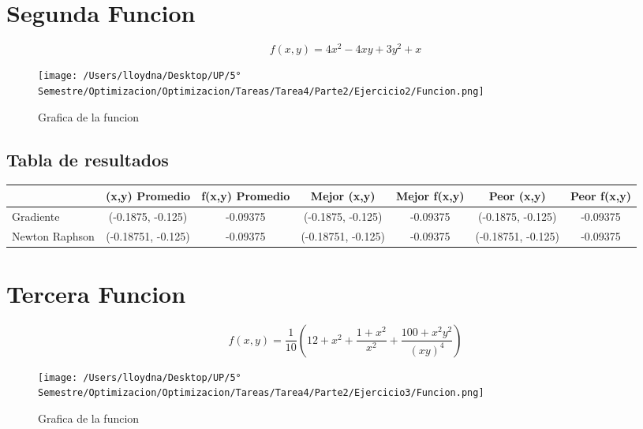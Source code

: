 \documentclass{report}
\begin{document}
        \section{Segunda Funcion}
            \begin{equation*}
                f(x,y)=4x^2-4xy+3y^2+x
            \end{equation*}

            \begin{figure}[H]
                \texttt{[image: /Users/lloydna/Desktop/UP/5° Semestre/Optimizacion/Optimizacion/Tareas/Tarea4/Parte2/Ejercicio2/Funcion.png]}
                \caption{Grafica de la funcion}
                \label{fig:fun15}
            \end{figure}

            \subsection{Tabla de resultados}
            \begin{tabular}{l|c|c|c|c|c|c}
                & (x,y) Promedio & f(x,y) Promedio & Mejor (x,y) & Mejor f(x,y) & Peor (x,y) & Peor f(x,y)\\
                \hline
                Gradiente & (-0.1875, -0.125) & -0.09375 & (-0.1875, -0.125) & -0.09375 & (-0.1875, -0.125) & -0.09375\\
                \hline
                Newton Raphson & (-0.18751, -0.125) & -0.09375 & (-0.18751, -0.125) & -0.09375 & (-0.18751, -0.125) & -0.09375\\
                \hline
            \end{tabular}
        \pagebreak
            
        \section{Tercera Funcion}
            \begin{equation*}
                f(x,y)=\frac{1}{10}(12+x^2+\frac{1+x^2}{x^2}+\frac{100+x^2y^2}{(xy)^4})
            \end{equation*}

            \begin{figure}[H]
                \texttt{[image: /Users/lloydna/Desktop/UP/5° Semestre/Optimizacion/Optimizacion/Tareas/Tarea4/Parte2/Ejercicio3/Funcion.png]}
                \caption{Grafica de la funcion}
                \label{fig:fun15}
            \end{figure}
\end{document}
